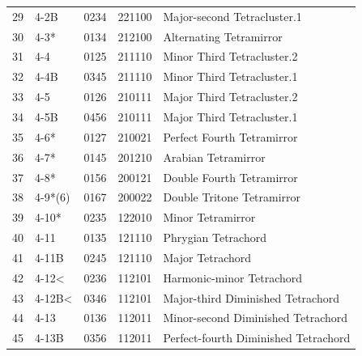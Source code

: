 \documentclass[
	12pt,				%
	openright,			%
	twoside,			%
	a4paper,			%
	english,			%
	french,				%
	spanish,			%
	brazil				%
	]{abntex2}
\begin{document}
\begin{anexosenv}
\begin{table}[h]
\begin{tabular}{lllll}
29 & 4-2B                           & 0234  & 221100          & Major-second Tetracluster.1                       \\
30 & 4-3*                           & 0134  & 212100          & Alternating Tetramirror                           \\
31 & 4-4                            & 0125  & 211110          & Minor Third Tetracluster.2                        \\
32 & 4-4B                           & 0345  & 211110          & Minor Third Tetracluster.1                        \\
33 & 4-5                            & 0126  & 210111          & Major Third Tetracluster.2                        \\
34 & 4-5B                           & 0456  & 210111          & Major Third Tetracluster.1                        \\
35 & 4-6*                           & 0127  & 210021          & Perfect Fourth Tetramirror                        \\
36 & 4-7*                           & 0145  & 201210          & Arabian Tetramirror                               \\
37 & 4-8*                           & 0156  & 200121          & Double Fourth Tetramirror                         \\
38 & 4-9*(6)                        & 0167  & 200022          & Double Tritone Tetramirror                        \\
39 & 4-10*                          & 0235  & 122010          & Minor Tetramirror                                 \\
40 & 4-11                           & 0135  & 121110          & Phrygian Tetrachord                               \\
41 & 4-11B                          & 0245  & 121110          & Major Tetrachord                                  \\
42 & 4-12\textless                  & 0236  & 112101          & Harmonic-minor Tetrachord                         \\
43 & 4-12B\textless                 & 0346  & 112101          & Major-third Diminished Tetrachord                 \\
44 & 4-13                           & 0136  & 112011          & Minor-second Diminished Tetrachord                \\
45 & 4-13B                          & 0356  & 112011          & Perfect-fourth Diminished Tetrachord              \\

\end{tabular}
\end{table}
\end{anexosenv}
\end{document}
